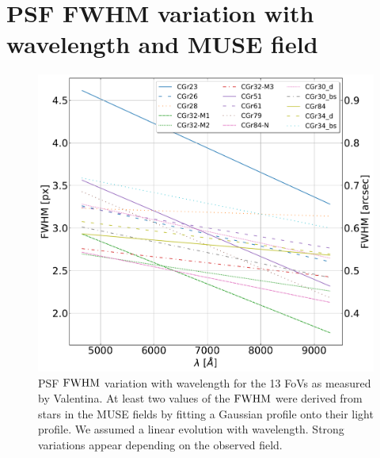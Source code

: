 \clearpage

\section{PSF FWHM variation with wavelength and MUSE field}

\begin{figure}[hbtp]
	\centering
	\includegraphics[width=0.7\linewidth]{../Plots/FWHM_variation_with_lambda.pdf}
	\caption[PSF FWHM variation with wavelength.]{PSF $\rm{FWHM}$ variation with wavelength for the 13 FoVs as measured by Valentina. At least two values of the $\rm{FWHM}$ were derived from stars in the MUSE fields by fitting a Gaussian profile onto their light profile. We assumed a linear evolution with wavelength. Strong variations appear depending on the observed field.}
	\label{fig:FWHM_var_lambda}
\end{figure}